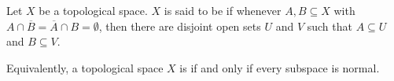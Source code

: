 \documentclass[12pt]{article}
\begin{document}
Let $X$ be a topological space.  $X$ is said to be \emph{} if whenever $A,B\subseteq X$ with $A\cap\overline{B}=\overline{A}\cap B=\emptyset$, then there are disjoint open sets $U$ and $V$ such that $A\subseteq U$ and $B\subseteq V$.

Equivalently, a topological space $X$ is  if and only if every subspace is normal.
\end{document}
